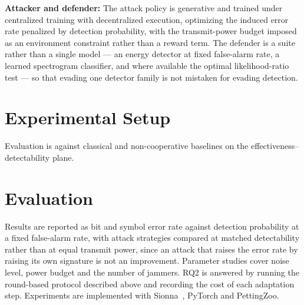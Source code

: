\documentclass[conference]{IEEEtran}
\newcommand{\adm}[1]{{\color{orange}{[#1]}}}
\newcommand{\adm}[1]{\ignorespaces}
\begin{document}
\textbf{Attacker and defender:}
The attack policy is generative and trained under centralized training with decentralized execution, optimizing the induced error rate penalized by detection probability, with the transmit-power budget imposed as an environment constraint rather than a reward term.
The defender is a suite rather than a single model --- an energy detector at fixed false-alarm rate, a learned spectrogram classifier, and where available the optimal likelihood-ratio test --- so that evading one detector family is not mistaken for evading detection.


\section{Experimental Setup}
Evaluation is against classical and non-cooperative baselines on the effectiveness--detectability plane.

\section{Evaluation}
Results are reported as bit and symbol error rate against detection probability at a fixed false-alarm rate, with attack strategies compared at matched detectability rather than at equal transmit power, since an attack that raises the error rate by raising its own signature is not an improvement.
Parameter studies cover noise level, power budget and the number of jammers. RQ2 is answered by running the round-based protocol described above and recording the cost of each adaptation step. Experiments are implemented with Sionna~\cite{hoydis2022sionna}, PyTorch and PettingZoo.


\end{document}
